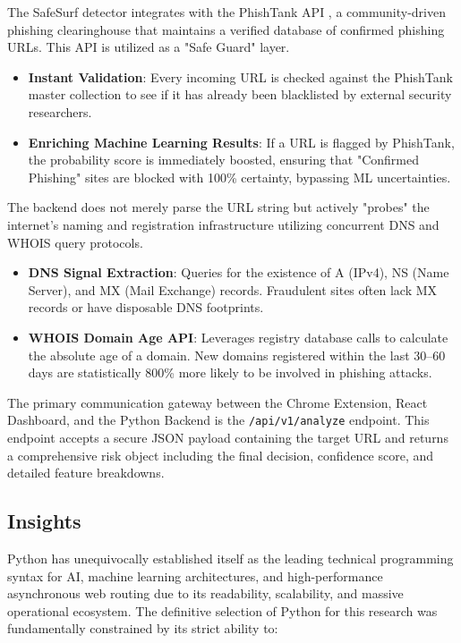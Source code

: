 
\noindent
The SafeSurf detector integrates with the PhishTank API \cite{ref17}, a community-driven phishing clearinghouse that maintains a verified database of confirmed phishing URLs. This API is utilized as a "Safe Guard" layer.
\begin{itemize}
\item \textbf{Instant Validation}: Every incoming URL is checked against the PhishTank master collection to see if it has already been blacklisted by external security researchers.
\item \textbf{Enriching Machine Learning Results}: If a URL is flagged by PhishTank, the probability score is immediately boosted, ensuring that "Confirmed Phishing" sites are blocked with 100\% certainty, bypassing ML uncertainties.
\end{itemize}


\noindent
The backend does not merely parse the URL string but actively "probes" the internet's naming and registration infrastructure utilizing concurrent DNS and WHOIS query protocols.
\begin{itemize}
\item \textbf{DNS Signal Extraction}: Queries for the existence of A (IPv4), NS (Name Server), and MX (Mail Exchange) records. Fraudulent sites often lack MX records or have disposable DNS footprints.
\item \textbf{WHOIS Domain Age API}: Leverages registry database calls to calculate the absolute age of a domain. New domains registered within the last 30--60 days are statistically 800\% more likely to be involved in phishing attacks.
\end{itemize}


\noindent
The primary communication gateway between the Chrome Extension, React Dashboard, and the Python Backend is the \texttt{/api/v1/analyze} endpoint. This endpoint accepts a secure JSON payload containing the target URL and returns a comprehensive risk object including the final decision, confidence score, and detailed feature breakdowns.

\subsection{Insights}
\noindent
Python has unequivocally established itself as the leading technical programming syntax for AI, machine learning architectures, and high-performance asynchronous web routing due to its readability, scalability, and massive operational ecosystem. The definitive selection of Python for this research was fundamentally constrained by its strict ability to:

